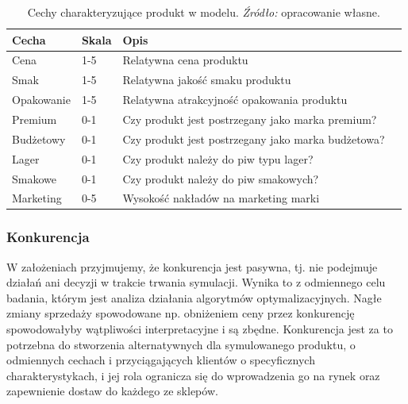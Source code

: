 \documentclass[polish, twoside, 12pt, a4paper]{article}
\theoremstyle{definition}
\theoremstyle{plain}
\theoremstyle{remark}
\begin{document}
\begin{table}[hbt]
  \centering
  \captionsetup{margin=10pt,font=small,labelfont=bf,width=.8\textwidth}
  \caption[Cechy charakteryzujące produkt w modelu]{Cechy charakteryzujące produkt w modelu. \textit{Źródło:} opracowanie własne.}
  \label{tab:cechyproduktu}
\vspace*{2ex}
\begin{tabular}{llll}
\hline
Cecha       & Skala & Opis                                                                                                        \\ \hline
Cena        & 1-5   & Relatywna cena produktu                                                             \\
Smak        & 1-5   & Relatywna jakość smaku produktu                                                       \\
Opakowanie  & 1-5   & Relatywna atrakcyjność opakowania produktu                                           \\
Premium      & 0-1   & Czy produkt jest postrzegany jako marka premium? \\
Budżetowy   & 0-1   & Czy produkt jest postrzegany jako marka budżetowa?  \\
Lager        & 0-1   & Czy produkt należy do piw typu lager?                                                                       \\
Smakowe     & 0-1   & Czy produkt należy do piw smakowych?                                                                        \\
Marketing   & 0-5   & Wysokość nakładów na marketing marki                                                                        \\ \hline
\end{tabular}
\end{table}

\subsubsection{Konkurencja}
 
W założeniach przyjmujemy, że konkurencja jest pasywna, tj. nie podejmuje działań ani decyzji w trakcie trwania symulacji. Wynika to z odmiennego celu badania, którym jest analiza działania algorytmów optymalizacyjnych. Nagłe zmiany sprzedaży spowodowane np. obniżeniem ceny przez konkurencję spowodowałyby wątpliwości interpretacyjne i są zbędne. Konkurencja jest za to potrzebna do stworzenia alternatywnych dla symulowanego produktu, o odmiennych cechach i przyciągających klientów o specyficznych charakterystykach, i jej rola ogranicza się do wprowadzenia go na rynek oraz zapewnienie dostaw do każdego ze sklepów.
\end{document}
